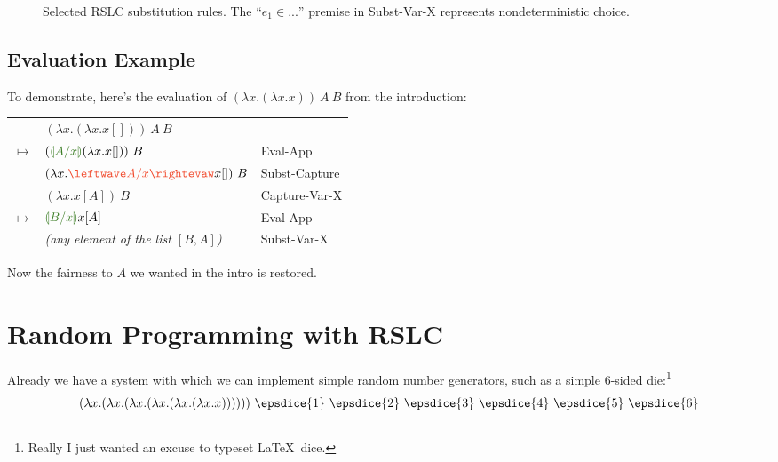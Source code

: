 \documentclass[10pt]{sigplanconf}
\begin{document}
\begin{figure}[t]
	\TypeRules{
		\SubstCapture \qquad \SubstLam \\
		\SubstVarX \qquad \SubstVarY \\
	}
	\TypeRules{
		\CaptureVarX \qquad \CaptureVarY \\
	}
	\caption{Selected RSLC substitution rules. The ``$e_1 \in ...$'' premise in {\sc Subst-Var-X} represents nondeterministic choice.}
	\label{fig:subst}
\end{figure}

\subsection{Evaluation Example} 

To demonstrate, here's the evaluation of $(\lambda x. (\lambda x. x))~A~B$ from the introduction:

\begin{center}
\begin{tabular}{cll}
	& $(\lambda x. (\lambda x. x[]))~A~B$ & \\
	$\mapsto$ & $(\subst{A}{x} (\lambda x. x[]))~B$ & {\sc \small Eval-App} \\
	\substeq & $(\lambda x. \capture{A}{x} x[])~B$ & {\sc \small Subst-Capture} \\
	\captureeq & $(\lambda x. x[A])~B$ & {\sc \small Capture-Var-X} \\
	$\mapsto$ & $\subst{B}{x} x[A]$ & {\sc \small Eval-App} \\
	\substeq & {\em (any element of the list $[B,A]$)} & {\sc \small Subst-Var-X}
\end{tabular}
\end{center}
Now the fairness to $A$ we wanted in the intro is restored.

\section{Random Programming with RSLC}

\newcommand{\Y}{\textsf{Y}}
\newcommand{\Ya}{\ensuremath{\mathsf{Y_1}}}
\newcommand{\Yab}{\ensuremath{\mathsf{Y_2}}}
\newcommand{\Yabc}{\ensuremath{\mathsf{Y_3}}}

Already we have a system with which we can implement simple random number generators, such as a simple 6-sided die:\footnote{Really I just wanted an excuse to typeset \LaTeX~dice.}
\[
(\lambda x.
(\lambda x.
(\lambda x.
(\lambda x.
(\lambda x.
(\lambda x. x))))))
~\epsdice{1}
~\epsdice{2}
~\epsdice{3}
~\epsdice{4}
~\epsdice{5}
~\epsdice{6}
\]
\end{document}
